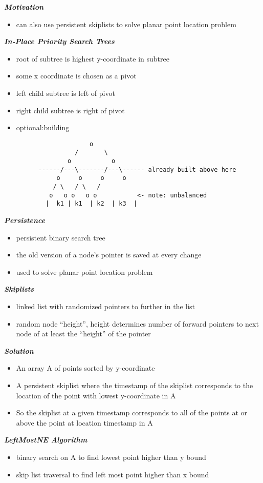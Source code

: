 \documentclass{article}
\begin{document}
{\bf\em Motivation}

\begin{itemize}
\item
     can also use persistent skiplists to solve planar point location problem
\end{itemize}

{\bf\em In-Place Priority Search Trees}

\begin{itemize}
\item
  root of subtree is highest y-coordinate in subtree
\item
  some x coordinate is chosen as a pivot
\item
  left child subtree is left of pivot
\item
  right child subtree is right of pivot
\item
  optional:building\\
\begin{verbatim}
	                o
	            /       \ 
	          o           o
	  ------/---\-------/---\------ already built above here
	       o     o     o     o
	      / \   / \   /
	     o   o o   o o           <- note: unbalanced
	    |  k1 | k1  | k2  | k3  |
\end{verbatim}
\end{itemize}

{\bf\em Persistence}

\begin{itemize}
\item
  persistent binary search tree
\item
  the old version of a node's pointer is saved at every change
\item
  used to solve planar point location problem
\end{itemize}

{\bf\em Skiplists}

\begin{itemize}
\item
  linked list with randomized pointers to further in the list
\item
  random node ``height'', height determines number of forward pointers
  to next node of at least the ``height'' of the pointer
\end{itemize}

{\bf\em Solution}

\begin{itemize}
\item
  An array A of points sorted by y-coordinate
\item
  A persistent skiplist where the timestamp of the skiplist corresponds to the
  location of the point with lowest y-coordinate in A
\item
  So the skiplist at a given timestamp corresponds to all of the points at or
  above the point at location timestamp in A
\end{itemize}

{\bf\em LeftMostNE Algorithm}

\begin{itemize}
\item
  binary search on A to find lowest point higher than y bound
\item
  skip list traversal to find left most point higher than x bound
\end{itemize}
\end{document}
